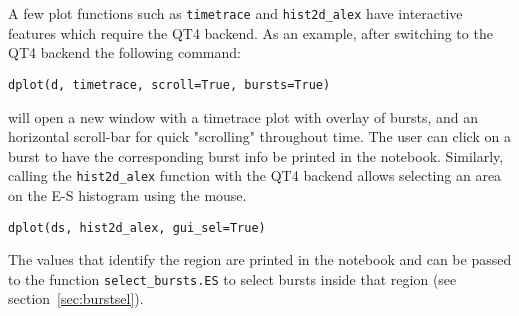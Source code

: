 A few plot functions such as \verb|timetrace| and \verb|hist2d_alex| have interactive features 
which require the QT4 backend. As an example, after switching to the QT4 backend
the following command:

\begin{lstlisting}
dplot(d, timetrace, scroll=True, bursts=True)
\end{lstlisting}

\noindent
will open a new window with a timetrace plot with overlay of bursts, and an horizontal scroll-bar for quick
"scrolling" throughout time. The user can click on a burst to have the corresponding burst info 
be printed in the notebook.
Similarly, calling the \verb|hist2d_alex| function with the QT4 backend allows
selecting an area on the E-S histogram using the mouse.

\begin{lstlisting}
dplot(ds, hist2d_alex, gui_sel=True)
\end{lstlisting}

The values that identify the region are printed in the notebook and can be passed
to the function \verb|select_bursts.ES| to select bursts inside that region 
(see section~\ref{sec:burstsel}).
